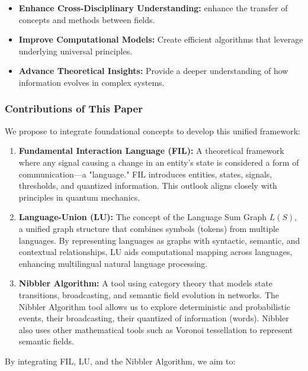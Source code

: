 \begin{itemize}[leftmargin=*, labelsep=5mm]
    \item \textbf{Enhance Cross-Disciplinary Understanding:} enhance the transfer of concepts and methods between fields.
    \item \textbf{Improve Computational Models:} Create efficient algorithms that leverage underlying universal principles.
    \item \textbf{Advance Theoretical Insights:} Provide a deeper understanding of how information evolves in complex systems.
\end{itemize}

\subsubsection{Contributions of This Paper}

We propose to integrate foundational concepts to develop this unified framework:

\begin{enumerate}[leftmargin=*, labelsep=5mm]
    \item \textbf{Fundamental Interaction Language (FIL):} A theoretical framework where any signal causing a change in an entity's state is considered a form of communication—a "language." FIL introduces entities, states, signals, thresholds, and quantized information. This outlook aligns closely with principles in quantum mechanics.

    \item \textbf{Language-Union (LU):} The concept of the Language Sum Graph $L(S)$, a unified graph structure that combines symbols (tokens) from multiple languages. By representing languages as graphs with syntactic, semantic, and contextual relationships, LU aids computational mapping across languages, enhancing multilingual natural language processing.

    \item \textbf{Nibbler Algorithm:} A tool using category theory that models state transitions, broadcasting, and semantic field evolution in networks. The Nibbler Algorithm tool allows us to explore deterministic and probabilistic events, their broadcasting, their quantized of information (words). Nibbler also uses other mathematical tools such as Voronoi tessellation to represent semantic fields.
\end{enumerate}

By integrating FIL, LU, and the Nibbler Algorithm, we aim to:

